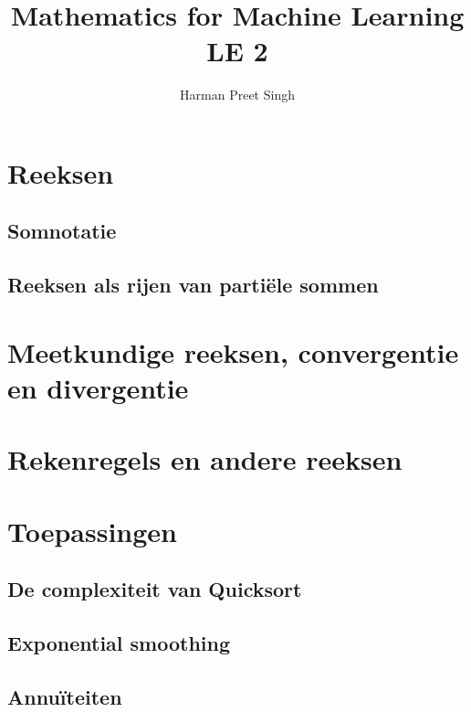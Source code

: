 \documentclass[a4paper, 12pt]{article}
\title{Mathematics for Machine Learning \textemdash{} LE 2}
\author{Harman Preet Singh}
\begin{document}

\maketitle
\tableofcontents

\section{Reeksen}
\subsection{Somnotatie}
\subsection{Reeksen als rijen van partiële sommen}

\section{Meetkundige reeksen, convergentie en divergentie}
\section{Rekenregels en andere reeksen}

\section{Toepassingen}
\subsection{De complexiteit van Quicksort}
\subsection{Exponential smoothing}
\subsection{Annuïteiten}
\end{document}
